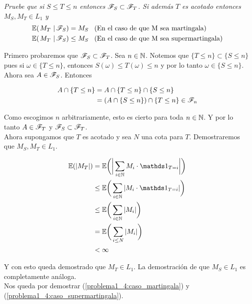 \emph{
	Pruebe que si $S\leq T\leq n$ entonces $\mathscr{F}_S\subset\mathscr{F}_T$. Si adem\'as $T$ es acotado entonces $M_S,M_T \in L_1$ y 
	\begin{align}
		\espc{M_T}{\F_S} = M_S &\mbox{\;\;\;(En el caso de que M sea martingala)} \label{problema1_4:caso_martingala}\\
		\espc{M_T}{\F_S}\leq M_S &\mbox{\;\;\;(En el caso de que M sea supermartingala)} \label{problema1_4:caso_supermartingala}
	\end{align}	
}

	Primero probaremos que $\mathscr{F}_S \subset \mathscr{F}_T$. Sea $n \in \mathbb{N}$. Notemos que $\{ T \leq n \} \subset \{ S \leq n \}$ pues
	si $\omega \in \{ T \leq n \}$, entonces $S(\omega) \leq T(\omega) \leq n $ y por lo tanto $\omega \in \{ S \leq n \}$.\\

	Ahora sea $A \in \mathscr{F}_S$. Entonces

	\begin{align}
		A \cap \{ T \leq n \} 	&=		A  \cap \{ T \leq n \} \cap \{ S \leq n \} \\
								&=		(A  \cap \{ S \leq n \}) \cap \{ T \leq n \} \in \mathscr{F}_n
	\end{align}

	Como escogimos $n$ arbitrariamente, esto es cierto para toda $n \in \mathbb{N}$. Y por lo tanto $A \in \mathscr{F}_T$ y $\mathscr{F}_S \subset \mathscr{F}_T$.\\

	Ahora supongamos que $T$ es acotado y sea $N$ una cota para $T$. Demostraremos que $M_S,M_T \in L_1$.
	
	\begin{align}
		\E(|M_T|) 	&=		\E\bigg(	\bigg| \sum_{i \in \N} M_i \cdot \indic_{T = i} \bigg|	\bigg) \\ 
					&\leq	\E\bigg(	\sum_{i \in \N} |M_i \cdot \indic_{T = i} |\bigg) \\
					&\leq	\E\bigg(	\sum_{i \in \N} |M_i|\bigg) \\
					&=		\E\bigg(	\sum_{i \leq N} |M_i|\bigg) \\
					&< 		\infty
	\end{align}
	
	Y con esto queda demostrado que $M_T \in L_1$. La demostración de que $M_S \in L_1$ es completamente análoga.\\
	
	Nos queda por demostrar (\ref{problema1_4:caso_martingala}) y (\ref{problema1_4:caso_supermartingala}).